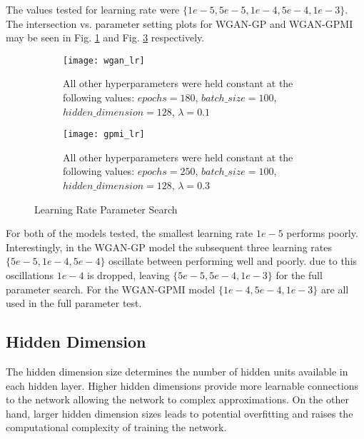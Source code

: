 The values tested for learning rate were $\{1e-5, 5e-5, 1e-4, 5e-4, 1e-3\}$. The intersection vs. parameter setting plots for WGAN-GP and WGAN-GPMI may be seen in Fig. \ref{fig:wgan_lr} and Fig. \ref{fig:gpmi_lr} respectively. 

\begin{figure}[!htbp]
	\centering
	\begin{subfigure}{.7\textwidth}
		\texttt{[image: wgan\_lr]}
	\end{subfigure}%
	\begin{subfigure}{.3\textwidth}
		\caption{
			All other hyperparameters were held constant at the following values: $epochs=180$, $batch\_size = 100$, $hidden\_dimension=128$, $\lambda=0.1$
		}
		\label{fig:wgan_lr}
	\end{subfigure}%
	
	\begin{subfigure}{.7\textwidth}
		\texttt{[image: gpmi\_lr]}
	\end{subfigure}%
	\begin{subfigure}{.3\textwidth}
		\caption{
			All other hyperparameters were held constant at the following values: $epochs=250$, $batch\_size=100$, $hidden\_dimension=128$, $\lambda=0.3$
		}
		\label{fig:gpmi_lr}
	\end{subfigure}%
	\caption{Learning Rate Parameter Search}
\end{figure}

For both of the models tested, the smallest learning rate $1e-5$ performs poorly. Interestingly, in the WGAN-GP model the subsequent three learning rates $\{5e-5,1e-4,5e-4\}$ oscillate between performing well and poorly. due to this oscillations $1e-4$ is dropped, leaving $\{5e-5,5e-4,1e-3\}$ for the full parameter search. For the WGAN-GPMI model $\{1e-4, 5e-4, 1e-3\}$ are all used in the full parameter test. 


\subsection{Hidden Dimension}
\label{sec:hdim}

The hidden dimension size determines the number of hidden units available in each hidden layer. Higher hidden dimensions provide more learnable connections to the network allowing the network to complex approximations. On the other hand, larger hidden dimension sizes leads to potential overfitting and raises the computational complexity of training the network. 

